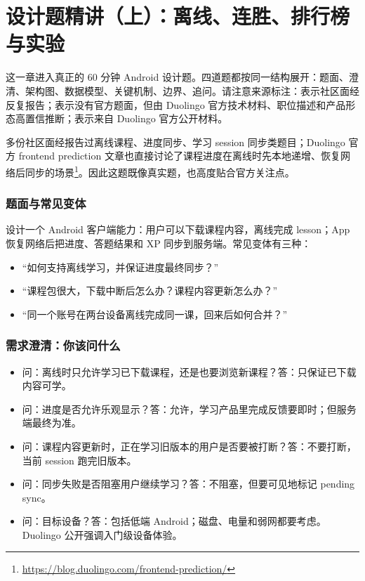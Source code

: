 \chapter{设计题精讲（上）：离线、连胜、排行榜与实验}

这一章进入真正的 60 分钟 Android 设计题。四道题都按同一结构展开：题面、澄清、架构图、数据模型、关键机制、边界、追问。请注意来源标注：\srccommunity 表示社区面经反复报告；\srcinferred 表示没有官方题面，但由 Duolingo 官方技术材料、职位描述和产品形态高置信推断；\srcofficial 表示来自 Duolingo 官方公开材料。


\srccommunity 多份社区面经报告过离线课程、进度同步、学习 session 同步类题目；\srcofficial Duolingo 官方 frontend prediction 文章也直接讨论了课程进度在离线时先本地递增、恢复网络后同步的场景\footnote{\url{https://blog.duolingo.com/frontend-prediction/}}。因此这题既像真实题，也高度贴合官方关注点。

\subsection{题面与常见变体}

设计一个 Android 客户端能力：用户可以下载课程内容，离线完成 lesson；App 恢复网络后把进度、答题结果和 XP 同步到服务端。常见变体有三种：

\begin{itemize}
  \item “如何支持离线学习，并保证进度最终同步？”
  \item “课程包很大，下载中断后怎么办？课程内容更新怎么办？”
  \item “同一个账号在两台设备离线完成同一课，回来后如何合并？”
\end{itemize}

\subsection{需求澄清：你该问什么}

\begin{itemize}
  \item 问：离线时只允许学习已下载课程，还是也要浏览新课程？答：只保证已下载内容可学。
  \item 问：进度是否允许乐观显示？答：允许，学习产品里完成反馈要即时；但服务端最终为准。
  \item 问：课程内容更新时，正在学习旧版本的用户是否要被打断？答：不要打断，当前 session 跑完旧版本。
  \item 问：同步失败是否阻塞用户继续学习？答：不阻塞，但要可见地标记 pending sync。
  \item 问：目标设备？答：包括低端 Android；磁盘、电量和弱网都要考虑。\srcofficial Duolingo 公开强调入门级设备体验。
\end{itemize}

